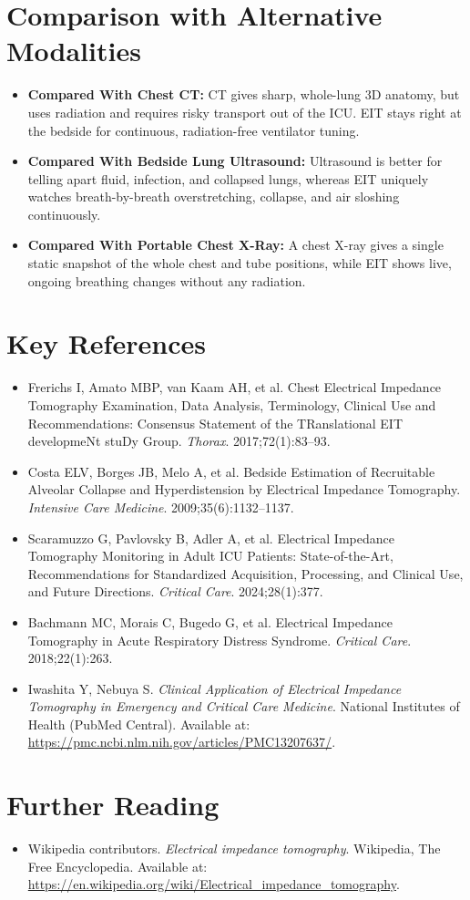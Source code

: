 \section{Comparison with Alternative Modalities}
\begin{itemize}
    \item \textbf{Compared With Chest CT:} CT gives sharp, whole-lung 3D anatomy, but uses radiation and requires risky transport out of the ICU. EIT stays right at the bedside for continuous, radiation-free ventilator tuning.
    \item \textbf{Compared With Bedside Lung Ultrasound:} Ultrasound is better for telling apart fluid, infection, and collapsed lungs, whereas EIT uniquely watches breath-by-breath overstretching, collapse, and air sloshing continuously.
    \item \textbf{Compared With Portable Chest X-Ray:} A chest X-ray gives a single static snapshot of the whole chest and tube positions, while EIT shows live, ongoing breathing changes without any radiation.
\end{itemize}

\section{Key References}
\begin{itemize}
    \item Frerichs I, Amato MBP, van Kaam AH, et al. Chest Electrical Impedance Tomography Examination, Data Analysis, Terminology, Clinical Use and Recommendations: Consensus Statement of the TRanslational EIT developmeNt stuDy Group. \textit{Thorax}. 2017;72(1):83--93.
    \item Costa ELV, Borges JB, Melo A, et al. Bedside Estimation of Recruitable Alveolar Collapse and Hyperdistension by Electrical Impedance Tomography. \textit{Intensive Care Medicine}. 2009;35(6):1132--1137.
    \item Scaramuzzo G, Pavlovsky B, Adler A, et al. Electrical Impedance Tomography Monitoring in Adult ICU Patients: State-of-the-Art, Recommendations for Standardized Acquisition, Processing, and Clinical Use, and Future Directions. \textit{Critical Care}. 2024;28(1):377.
    \item Bachmann MC, Morais C, Bugedo G, et al. Electrical Impedance Tomography in Acute Respiratory Distress Syndrome. \textit{Critical Care}. 2018;22(1):263.
    \item Iwashita Y, Nebuya S. \textit{Clinical Application of Electrical Impedance Tomography in Emergency and Critical Care Medicine}. National Institutes of Health (PubMed Central). Available at: \url{https://pmc.ncbi.nlm.nih.gov/articles/PMC13207637/}.
\end{itemize}

\section{Further Reading}
\begin{itemize}
  \item Wikipedia contributors. \textit{Electrical impedance tomography}. Wikipedia, The Free Encyclopedia. Available at: \url{https://en.wikipedia.org/wiki/Electrical_impedance_tomography}.
\end{itemize}
